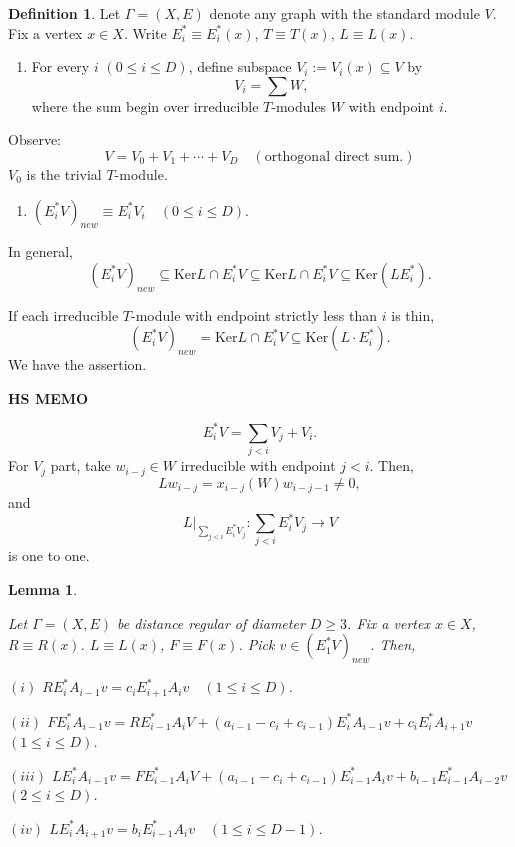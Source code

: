 \documentclass[
]{book}
\providecommand{\tightlist}{%
  \setlength{\itemsep}{0pt}\setlength{\parskip}{0pt}}
\newtheorem{lemma}{Lemma}[chapter]
\theoremstyle{definition}
\newtheorem{definition}{Definition}[chapter]
\theoremstyle{definition}
\theoremstyle{definition}
\theoremstyle{definition}
\theoremstyle{remark}
\begin{document}
\begin{definition}
\protect\hypertarget{def:vix}{}\label{def:vix}Let \(\Gamma = (X, E)\) denote any graph with the standard module \(V\). Fix a vertex \(x\in X\). Write \(E^*_i \equiv E^*_i(x)\), \(T \equiv T(x)\), \(L\equiv L(x)\).

\begin{enumerate}
\def\labelenumi{\arabic{enumi}.}
\tightlist
\item
  For every \(i\) \((0\leq i\leq D)\), define subspace \(V_i := V_i(x) \subseteq V\) by
  \[V_i = \sum W,\]
  where the sum begin over irreducible \(T\)-modules \(W\) with endpoint \(i\).
\end{enumerate}

Observe:
\[V = V_0 + V_1 + \cdots + V_D \quad (\text{orthogonal direct sum.})\]
\(V_0\) is the trivial \(T\)-module.

\begin{enumerate}
\def\labelenumi{\arabic{enumi}.}
\setcounter{enumi}{1}
\tightlist
\item
  \((E^*_iV)_{new} \equiv E^*_iV_i \quad (0\leq i\leq D).\)
\end{enumerate}

In general,
\[(E^*_iV)_{new} \subseteq \mathrm{Ker}L \cap E^*_iV \subseteq \mathrm{Ker}L \cap E^*_iV \subseteq \mathrm{Ker}(LE^*_i).\]

If each irreducible \(T\)-module with endpoint strictly less than \(i\) is thin,
\[(E^*_iV)_{new} = \mathrm{Ker}L \cap E^*_iV \subseteq \mathrm{Ker}(L\cdot E^*_i).\]
We have the assertion.
\end{definition}

\textbf{HS MEMO}

\[E^*_iV = \sum_{j<i} V_j + V_i.\]
For \(V_j\) part, take \(w_{i-j}\in W\) irreducible with endpoint \(j<i\). Then,
\[Lw_{i-j} = x_{i-j}(W)w_{i-j-1}\neq 0,\]
and
\[L|_{\sum_{j<i}E^*_iV_j}: \sum_{j<i}E^*_iV_j \to V\]
is one to one.

\begin{lemma}
\protect\hypertarget{lem:action-on-estar1v-new}{}\label{lem:action-on-estar1v-new}

Let \(\Gamma = (X, E)\) be distance regular of diameter \(D\geq 3\). Fix a vertex \(x\in X\), \(R\equiv R(x)\). \(L\equiv L(x)\), \(F \equiv F(x)\). Pick \(v\in (E^*_1V)_{new}\). Then,

\((i)\) \(RE^*_iA_{i-1}v = c_iE^*_{i+1}A_iv\quad (1\leq i\leq D)\).

\((ii)\) \(FE^*_iA_{i-1}v = RE^*_{i-1}A_iV + (a_{i-1}-c_i+c_{i-1})E^*_iA_{i-1}v + c_{i}E^*_{i}A_{i+1}v\) \((1\leq i\leq D)\).

\((iii)\) \(LE^*_iA_{i-1}v = FE^*_{i-1}A_iV + (a_{i-1}-c_i+c_{i-1})E^*_{i-1}A_{i}v + b_{i-1}E^*_{i-1}A_{i-2}v\) \((2\leq i\leq D)\).

\((iv)\) \(LE^*_iA_{i+1}v = b_iE^*_{i-1}A_iv \quad (1\leq i\leq D-1)\).

\end{lemma}
\end{document}
